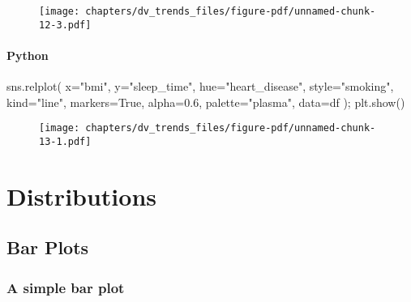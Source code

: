 \documentclass[
  letterpaper,
  DIV=11,
  numbers=noendperiod]{scrreprt}
\newenvironment{Shaded}{\begin{snugshade}}{\end{snugshade}}
\newcommand{\FloatTok}[1]{\textcolor[rgb]{0.68,0.00,0.00}{#1}}
\newcommand{\NormalTok}[1]{\textcolor[rgb]{0.00,0.46,0.62}{#1}}
\newcommand{\OperatorTok}[1]{\textcolor[rgb]{0.37,0.37,0.37}{#1}}
\newcommand{\StringTok}[1]{\textcolor[rgb]{0.13,0.47,0.30}{#1}}
\newcommand{\VariableTok}[1]{\textcolor[rgb]{0.07,0.07,0.07}{#1}}
\begin{document}
\begin{figure}[H]

{\centering \texttt{[image: chapters/dv\_trends\_files/figure-pdf/unnamed-chunk-12-3.pdf]}

}

\end{figure}

\hypertarget{python-42}{%
\subsubsection{Python}\label{python-42}}

\begin{Shaded}
\begin{Highlighting}[]
\NormalTok{sns.relplot(}
\NormalTok{    x}\OperatorTok{=}\StringTok{"bmi"}\NormalTok{, y}\OperatorTok{=}\StringTok{"sleep\_time"}\NormalTok{, hue}\OperatorTok{=}\StringTok{"heart\_disease"}\NormalTok{, style}\OperatorTok{=}\StringTok{"smoking"}\NormalTok{,}
\NormalTok{    kind}\OperatorTok{=}\StringTok{"line"}\NormalTok{, markers}\OperatorTok{=}\VariableTok{True}\NormalTok{, alpha}\OperatorTok{=}\FloatTok{0.6}\NormalTok{, }
\NormalTok{    palette}\OperatorTok{=}\StringTok{"plasma"}\NormalTok{,}
\NormalTok{    data}\OperatorTok{=}\NormalTok{df}
\NormalTok{)}\OperatorTok{;}
\NormalTok{plt.show()}
\end{Highlighting}
\end{Shaded}

\begin{figure}[H]

{\centering \texttt{[image: chapters/dv\_trends\_files/figure-pdf/unnamed-chunk-13-1.pdf]}

}

\end{figure}

\hypertarget{distributions}{%
\chapter{Distributions}\label{distributions}}

\hypertarget{bar-plots}{%
\section{Bar Plots}\label{bar-plots}}

\hypertarget{a-simple-bar-plot}{%
\subsection{A simple bar plot}\label{a-simple-bar-plot}}
\end{document}
